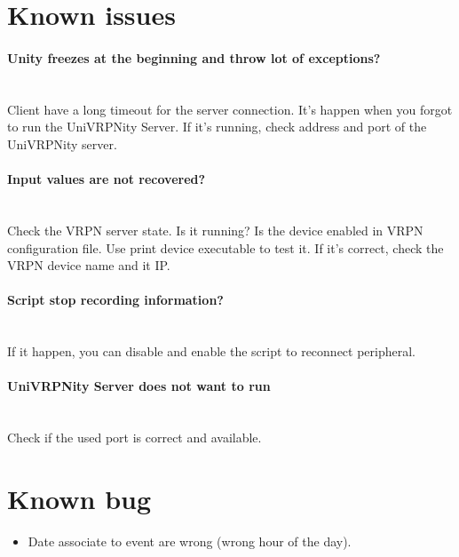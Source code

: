 \documentclass[11pt]{article} %
\begin{document}
\section{Known issues}

	\paragraph{Unity freezes at the beginning and throw lot of exceptions?} ~~\\
		Client have a long timeout for the server connection. It's happen when you forgot to run the UniVRPNity Server. If it's running, check address and port of the UniVRPNity server.
	
	\paragraph{Input values are not recovered?} ~~\\
		Check the VRPN server state. Is it running? Is the device enabled in VRPN configuration file. Use print device executable to test it. If it's correct, check the VRPN device name and it IP.
	
	\paragraph{Script stop recording information?} ~~\\
		If it happen, you can disable and enable the script to reconnect peripheral.

	
	\paragraph{UniVRPNity Server does not want to run} ~~\\
		Check if the used port is correct and available.

	
\section{Known bug}
	\begin{itemize}
		\item Date associate to event are wrong (wrong hour of the day). 
	\end{itemize}
	
\end{document}
